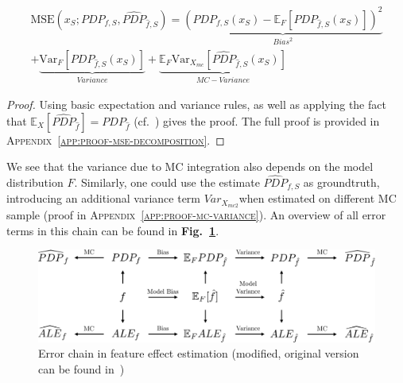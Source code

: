 \documentclass[runningheads]{llncs}
\begin{document}
\begin{equation}
    \begin{split}
        \text{MSE}(x_S; PDP_{f,S}, \widehat{PDP}_{\hat f,S})
        = \underbrace{{(PDP_{f,S}(x_S) - \mathbb{E}_F[PDP_{\hat{f}, S}(x_S)])}^2}_{Bias^2} \\
        + \underbrace{\text{Var}_F[PDP_{\hat{f},S}(x_S)]}_{Variance} + \underbrace{\mathbb{E}_F\text{Var}_{X_{mc}}[\widehat{PDP}_{\hat{f},S}(x_S)]}_{MC-Variance}
    \end{split}
\end{equation}

\begin{proof}
    Using basic expectation and variance rules, as well as applying the fact that
    $\mathbb{E}_X[\widehat{PDP}_{\hat f}] = PDP_{\hat f}$ (cf.~\cite{molnar_relating_2023})
    gives the proof. The full proof is provided in
    \textsc{Appendix~\ref{app:proof-mse-decomposition}}.
\end{proof}

\noindent We see that the variance due to MC integration also depends on the model
distribution $F$. Similarly, one could use the estimate $\widehat{PDP}_{f,S}$
as groundtruth, introducing an additional variance term $Var_{X_{mc2}}$when
estimated on different MC sample (proof in
\textsc{Appendix~\ref{app:proof-mc-variance}}).
An overview of all error terms in this chain can be found in
\textbf{Fig.\@~\ref{fig:error-graph}}.\\

\begin{figure}[t]
    \includegraphics[width=\textwidth]{img/error_graph.pdf}
    \caption{Error chain in feature effect estimation
        (modified, original version can be found in~\cite{molnar_relating_2023})}\label{fig:error-graph}
\end{figure}
\end{document}
